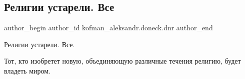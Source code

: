  
 
 
 
 
 
\subsection{Религии устарели. Все}
\label{sec:28_11_2021.fb.kofman_aleksandr.doneck.dnr.1.religii_ustareli_vse}
 
\ifcmt
 author_begin
   author_id kofman_aleksandr.doneck.dnr
 author_end
\fi

Религии устарели. Все.

Тот, кто изобретет новую, объединяющую различные течения религию, будет владеть
миром.

